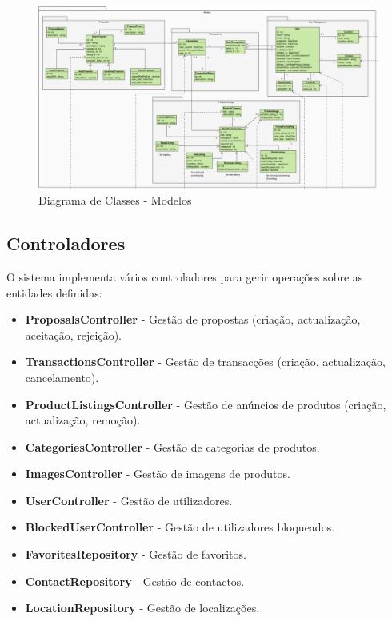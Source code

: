 \documentclass[a4paper, 12pt]{article} %
\begin{document}
\begin{figure}[ht]
	\centering
	\includegraphics[width=\textwidth]{../images/class-diagram-models.png}
	\caption{Diagrama de Classes - Modelos}
	\label{fig:class_diagram_models}
\end{figure}

\newpage
\subsection{Controladores}
O sistema implementa vários controladores para gerir operações sobre as entidades definidas:
\begin{itemize}
	\item \textbf{ProposalsController} - Gestão de propostas (criação, actualização, aceitação, rejeição).
	\item \textbf{TransactionsController} - Gestão de transacções (criação, actualização, cancelamento).
	\item \textbf{ProductListingsController} - Gestão de anúncios de produtos (criação, actualização, remoção).
	\item \textbf{CategoriesController} - Gestão de categorias de produtos.
	\item \textbf{ImagesController} - Gestão de imagens de produtos.
	\item \textbf{UserController} - Gestão de utilizadores.
	\item \textbf{BlockedUserController} - Gestão de utilizadores bloqueados.
	\item \textbf{FavoritesRepository} - Gestão de favoritos.
	\item \textbf{ContactRepository} - Gestão de contactos.
	\item \textbf{LocationRepository} - Gestão de localizações.
\end{itemize}
\end{document}
